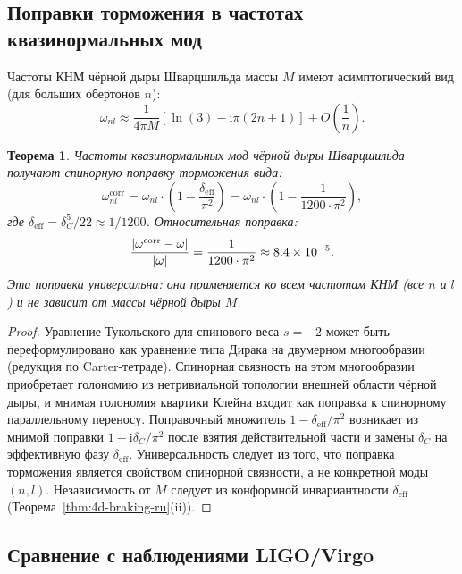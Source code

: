\documentclass[12pt,a4paper]{article}
\newtheorem{theorem}{Теорема}[section]
\theoremstyle{definition}
\theoremstyle{remark}
\newcommand{\ii}{\mathrm{i}}
\DeclarePairedDelimiter\abs{\lvert}{\rvert}
\begin{document}
\subsection{Поправки торможения в частотах квазинормальных мод}

Частоты КНМ чёрной дыры Шварцшильда массы $M$ имеют асимптотический вид (для больших обертонов $n$):
\begin{equation}
\omega_{nl} \approx \frac{1}{4\pi M}\left[\ln(3) - \ii\pi\left(2n + 1\right)\right] + O\left(\frac{1}{n}\right).
\end{equation}

\begin{theorem}
\label{thm:qnm-braking-ru}
Частоты квазинормальных мод чёрной дыры Шварцшильда получают спинорную поправку торможения вида:
\begin{equation}
\omega_{nl}^{\mathrm{corr}} = \omega_{nl} \cdot \left(1 - \frac{\delta_{\mathrm{eff}}}{\pi^2}\right) = \omega_{nl} \cdot \left(1 - \frac{1}{1200 \cdot \pi^2}\right),
\end{equation}
где $\delta_{\mathrm{eff}} = \delta_C^5/22 \approx 1/1200$. Относительная поправка:
\begin{equation}
\frac{\abs{\omega^{\mathrm{corr}} - \omega}}{\abs{\omega}} = \frac{1}{1200 \cdot \pi^2} \approx 8.4 \times 10^{-5}.
\end{equation}
Эта поправка универсальна: она применяется ко всем частотам КНМ (все $n$ и $l$) и не зависит от массы чёрной дыры $M$.
\end{theorem}

\begin{proof}
Уравнение Тукольского для спинового веса $s = -2$ может быть переформулировано как уравнение типа Дирака на двумерном многообразии (редукция по Carter-тетраде). Спинорная связность на этом многообразии приобретает голономию из нетривиальной топологии внешней области чёрной дыры, и мнимая голономия квартики Клейна входит как поправка к спинорному параллельному переносу. Поправочный множитель $1 - \delta_{\mathrm{eff}}/\pi^2$ возникает из мнимой поправки $1 - \ii\delta_C/\pi^2$ после взятия действительной части и замены $\delta_C$ на эффективную фазу $\delta_{\mathrm{eff}}$. Универсальность следует из того, что поправка торможения является свойством спинорной связности, а не конкретной моды $(n, l)$. Независимость от $M$ следует из конформной инвариантности $\delta_{\mathrm{eff}}$ (Теорема~\ref{thm:4d-braking-ru}(ii)).
\end{proof}

\subsection{Сравнение с наблюдениями LIGO/Virgo}
\end{document}
